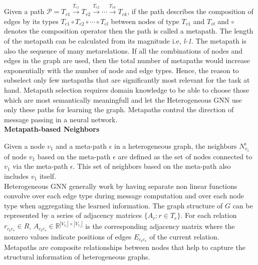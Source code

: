 \documentclass{report} %
\begin{document}
Given a path
\(
\mathcal{P} = T_{v1} \xrightarrow{T_{e1}} T_{v2} \xrightarrow{T_{e2}} \cdots \xrightarrow{T_{vk}} T_{ek}
\), 
if the path describes the composition of edges by its types \( T_{e1} \circ T_{e2} \circ \cdots \circ T_{el} \) between nodes of type \( T_{v1} \) and \( T_{vl} \) and 
$\circ$ denotes the composition operator then the path is called a metapath. The length of the metapath can be calculated from its magnitude i.e, \textit{l-1}. 
The metapath is also the sequence of many metarelations.  If all the combinations of nodes and edges in the graph are used, then the total number of metapaths would 
increase exponentially with the number of node and edge types. Hence, the reason to subselect only few metapaths that are significantly most relevant for the task at hand. 
Metapath selection requires domain knowledge to be able to choose those which are most semantically meaningfull and let the Heterogeneous \ac{GNN} use only these paths 
for learning the graph. Metapaths control the direction of message passing in a neural network.\\

\textbf{Metapath-based Neighbors}

Given a node \( v_1 \) and a meta-path \( \epsilon \) in a heterogeneous graph, the neighbors \( N_{v_1}^{\epsilon} \) of 
node \( v_1 \) based on the meta-path \( \epsilon \) are defined as the set of nodes connected to \( v_1 \) via the meta-path \( \epsilon \). 
This set of neighbors based on the meta-path also includes \( v_1 \) itself.\\

Heterogeneous \ac{GNN} generally work by having separate non linear functions convolve over each edge type during message computation and over each node type when aggregating the learned information. 
The graph structure of \( G \) can be represented by a series of adjacency matrices \(\{A_r : r \in T_e\}\). 
For each relation \(r_{c_t c_s} \in R\), \(A_{c_t c_s} \in \mathbb{R}^{|V_{c_t}| \times |V_{c_s}|}\) is the corresponding 
adjacency matrix where the nonzero values indicate positions of edges \(E_{c_t c_s}\) of the current relation.\\

Metapaths are composite relationships between nodes that help to capture the structural information of heterogeneous graphs.
\end{document}
